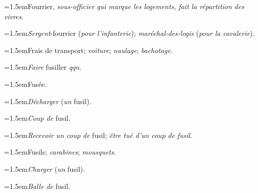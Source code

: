 \par{\dictfontsize\hangindent=1.5em\noindent Fourrier, \textit{sous-officier qui marque les logements, fait la répartition des vivres}. \par}
\par{\dictfontsize\hangindent=1.5em\noindent \textit{Sergent}-fourrier (\textit{pour l’infanterie}); \textit{maréchal-des-logis} (\textit{pour la cavalerie}). \par}
\par{\dictfontsize\hangindent=1.5em\noindent Frais de transport; \textit{voiture}; \textit{naulage}; \textit{bachotage}. \par}
\par{\dictfontsize\hangindent=1.5em\noindent \textit{Faire} fusiller \textit{qqn}. \par}
\par{\dictfontsize\hangindent=1.5em\noindent Fusée. \par}
\par{\dictfontsize\hangindent=1.5em\noindent \textit{Décharger} (\textit{un} fusil). \par}
\par{\dictfontsize\hangindent=1.5em\noindent \textit{Coup de} fusil. \par}
\par{\dictfontsize\hangindent=1.5em\noindent \textit{Recevoir un coup de} fusil; \textit{être tué d’un coup de fusil}. \par}
\par{\dictfontsize\hangindent=1.5em\noindent Fusils; \textit{carabines}; \textit{mousquets}. \par}
\par{\dictfontsize\hangindent=1.5em\noindent \textit{Charger} (\textit{un} fusil). \par}
\par{\dictfontsize\hangindent=1.5em\noindent \textit{Balle de} fusil. \par}
